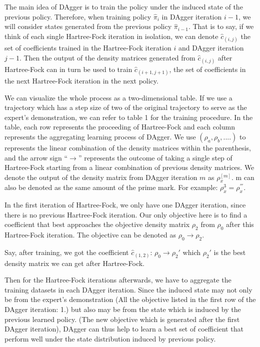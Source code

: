 \documentclass[twoside]{article}
\begin{document}
The main idea of DAgger is to train the policy under the induced state of the previous policy. Therefore, when training policy $\hat{\pi}_{i}$ in DAgger iteration $i-1$,
we will consider states generated from the previous policy $\hat{\pi}_{i-1}$. That is to say, if we think of each single Hartree-Fock iteration in isolation, we can denote $\hat{c}_{(i,j)}$ the set of coefficients trained in the Hartree-Fock iteration $i$ and DAgger iteration $j-1$. Then the output of the density matrices generated from $\hat{c}_{(i,j)}$ after Hartree-Fock can in turn be used to train $\hat{c}_{(i+1,j+1)}$, the set of coefficients in the next Hartree-Fock iteration in the next policy.


We can visualize the whole process as a two-dimensional table. If we use a trajectory which has a step size of two of the original trajectory to serve as the expert's demonstration, we can refer to table 1 for the training procedure.
In the table, each row represents the proceeding of Hartree-Fock and each column represents the aggregating learning process of DAgger. We use $(\rho_a, \rho_b, ....)$ to represents the linear combination of the density matrices within the parenthesis, and the arrow sign ``$\rightarrow$'' represents the outcome of taking a single step of Hartree-Fock starting from a linear combination of previous density matrices. We denote the output of the density matrix from DAgger iteration $m$ as $\rho_x^{[m]}$. m can also be denoted as the same amount of the prime mark. For example: $\rho_x^{3} = \rho_x^{'''}$.

In the first iteration of Hartree-Fock, we only have one DAgger iteration, since there is no previous Hartree-Fock iteration. Our only objective here is to find a coefficient that best approaches the objective density matrix $\rho_2$ from  $\rho_0$ after this Hartree-Fock iteration. The objective can be denoted as $\rho_0 \rightarrow \rho_2$. 

Say, after training, we got the coefficient $\hat{c}_{(1,2)}$: $\rho_0 \rightarrow \rho_{2}'$ which $\rho_2'$ is the best density matrix we can get after Hartree-Fock.

Then for the Hartree-Fock iterations afterwards, we have to aggregate the training datasets in each DAgger iteration. Since the induced state may not only be from the expert's demonstration (All the objective listed in the first row of the DAgger iteration: 1.) but also
 may be from the state which is induced by the previous learned policy. (The new objective which is generated after the first DAgger iteration), DAgger can thus help to learn a best set of coefficient that perform well under the state distribution induced by previous policy.
\end{document}
